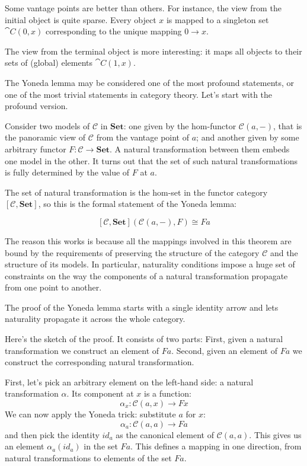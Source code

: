 \documentclass[DaoFP]{subfiles}
\begin{document}
Some vantage points are better than others. For instance, the view from the initial object is quite sparse. Every object $x$ is mapped to a singleton set $\cat C(0, x)$ corresponding to the unique mapping $0 \to x$. 

The view from the terminal object is more interesting: it maps all objects to their sets of (global) elements $\cat C(1, x)$. 

The Yoneda lemma may be considered one of the most profound statements, or one of the most trivial statements in category theory. Let's start with the profound version. 

Consider two models of $\mathcal{C}$ in $\mathbf{Set}$: one given by the hom-functor  $\mathcal{C}(a, -)$, that is the panoramic view of $\mathcal{C}$ from the vantage point of $a$; and another given by some arbitrary functor $F \colon \mathcal{C} \to \mathbf{Set}$. A natural transformation between them embeds one model in the other. It turns out that the set of such natural transformations is fully determined by the value of $F$ at $a$.

The set of natural transformation is the hom-set in the functor category $[\mathcal{C}, \mathbf{Set}]$, so this is the formal statement of the Yoneda lemma:

\[ [\mathcal{C}, \mathbf{Set}]( \mathcal{C}(a, -), F) \cong F a \]

The reason this works is because all the mappings involved in this theorem are bound by the requirements of preserving the structure of the category $\mathcal{C}$ and the structure of its models. In particular, naturality conditions impose a huge set of constraints on the way the components of a natural transformation propagate from one point to another. 

The proof of the Yoneda lemma starts with a single identity arrow and lets naturality propagate it across the whole category.

Here's the sketch of the proof. It consists of two parts: First, given a natural transformation we construct an element of $F a$. Second, given an element of $F a$ we construct the corresponding natural transformation. 

First, let's pick an arbitrary element on the left-hand side: a natural transformation $\alpha$. Its component at $x$ is a function:
\[ \alpha_x \colon \mathcal{C}(a, x) \to F x \]
We can now apply the Yoneda trick: substitute $a$ for $x$:
\[ \alpha_a \colon \mathcal{C}(a, a) \to F a \]
and then pick the identity $id_a$ as the canonical element of $\mathcal{C}(a, a)$. This gives us an element $\alpha_a (id_a)$ in the set $F a$. This defines a mapping in one direction, from natural transformations to elements of the set $F a$.
\end{document}
